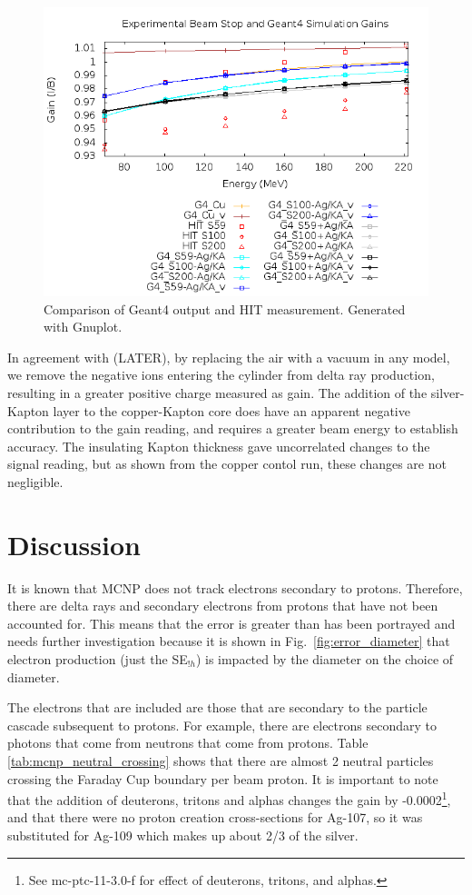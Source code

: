 \documentclass{mc2015}
\begin{document}
\begin{figure}[h]
  \centering
  \includegraphics[width=5in]{figures/fig_results.png}
  \caption{Comparison of Geant4 output and HIT measurement.  Generated with Gnuplot.}
  \label{fig:comp_results}
\end{figure}

In agreement with (LATER), by replacing the air with a vacuum in any model, we remove the negative ions entering the cylinder from delta ray production, resulting in a greater positive charge measured as gain.  The addition of the silver-Kapton layer to the copper-Kapton core does have an apparent negative contribution to the gain reading, and requires a greater beam energy to establish accuracy.  The insulating Kapton thickness gave uncorrelated changes to the signal reading, but as shown from the copper contol run, these changes are not negligible.

\section{Discussion}

It is known that MCNP does not track electrons secondary to protons. Therefore, there are delta rays and secondary electrons from protons that have not been accounted for. This means that the error is greater than has been portrayed and needs further investigation because it is shown in Fig.~\ref{fig:error_diameter} that electron production (just the SE$_{!h}$) is impacted by the diameter on the choice of diameter.

The electrons that are included are those that are secondary to the particle cascade subsequent to protons. For example, there are electrons secondary to photons that come from neutrons that come from protons. Table \ref{tab:mcnp_neutral_crossing} shows that there are almost 2 neutral particles crossing the Faraday Cup boundary per beam proton. It is important to note that the addition of deuterons, tritons and alphas changes the gain by -0.0002\footnote{See mc-ptc-11-3.0-f for effect of deuterons, tritons, and alphas.}, and that there were no proton creation cross-sections for Ag-107, so it was substituted for Ag-109 which makes up about 2/3 of the silver.
\end{document}
